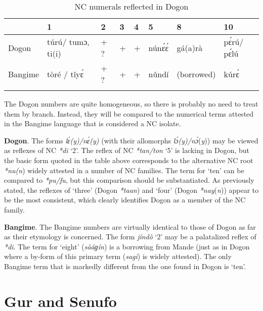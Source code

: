 \begin{table}
\caption{\label{tab:5:8}NC numerals reflected in Dogon}


\begin{tabularx}{\textwidth}{lllllllQ} 
\lsptoprule
& {1} & {2} & {3} & {4} & {5} & {8} & {10}\\
\midrule 
{Dogon} & {túrú/} {tumɔ,} {ti(i)} & {+} ?  & {+} & {+} & {nún{\'{ɛ}}{\'{ɛ}}} & {gá(a)rà} & {p{\'{ɛ}}rú/} {p{\'{ɛ}}lú}\\
{Bangime} & {tòré} {/} {t{\v{i}}y{\'{ɛ}}} & {+} ?  & {+} & {+} & {n{\v{u}}ndí} & {(borrowed)} & {kúr{\'{ɛ}}}\\
\lspbottomrule
\end{tabularx}
\end{table}
The Dogon numbers are quite homogeneous, so there is probably no need to treat them by branch. Instead, they will be compared to the numerical terms attested in the Bangime language that is considered a NC isolate. 

\textbf{Dogon}. The forms \textit{l{\'{ɛ}}(}\textit{y)/n{\'{ɛ}}(}\textit{y)} (with their allomorphs \textit{l{\'{ɔ}}(}\textit{y)/n{\'{ɔ}}}(\textit{y})) may be viewed as reflexes of NC \textit{*di} ‘2’. The reflex of  NC \textit{*tan}\textit{/ton}  ‘5’ is lacking in Dogon, but the basic form quoted in the table above corresponds to the alternative NC root \textit{*nu}\textit{(n}) widely attested in a number of NC families. The term for ‘ten’ can be compared to \textit{*pu}\textit{/fu}, but this comparison should be substantiated. As previously stated, the reflexes of ‘three’ (Dogon \textit{*taan}) and ‘four’ (Dogon \textit{*nay}(\textit{n})) appear to be the most consistent, which clearly identifies Dogon as a member of the NC family.

\textbf{Bangime}. The Bangime numbers are virtually identical to those of Dogon as far as their etymology is concerned. The form \textit{jíndò} ‘2’ may be a palatalized reflex of \textit{*di}. The term for ‘eight’ (\textit{sàáɡín}) is a borrowing from Mande (just as in Dogon where a by-form of this primary term (\textit{sagi}) is widely attested). The only Bangime term that is markedly different from the one found in Dogon is ‘ten’.


\section{Gur and Senufo}%

